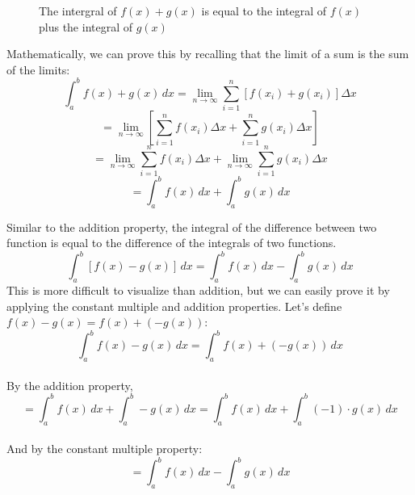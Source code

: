 \begin{figure}[htbp]
    \centering
    \caption{The intergral of $f(x) + g(x)$ is equal to the integral 
    of $f(x)$ plus the integral of $g(x)$}
    \label{fig:intsum}
\end{figure}

Mathematically, we can prove this by recalling that the limit of a 
sum is the sum of the limits: $$\int_a^b f(x) + g(x)\,dx = 
\lim_{n \to \infty} \sum_{i=1}^n [f(x_i)+g(x_i)]\Delta x$$ 
$$=\lim_{n \to \infty} [\sum_{i=1}^n f(x_i)\Delta x + \sum_{i = 1}^n 
g(x_i) \Delta x]$$ $$= \lim_{n \to \infty}\sum_{i=1}^n f(x_i)\Delta 
x + \lim_{n \to \infty} \sum_{i = 1}^n g(x_i) \Delta x$$ $$ = 
\int_a^b f(x)\,dx + \int_a^b g(x)\,dx$$

Similar to the addition property, the integral of the difference 
between two function is equal to the difference of the integrals of 
two functions. $$\int_a^b [f(x) - g(x)]\,dx = \int_a^b f(x)\,dx - 
\int_a^b g(x)\,dx$$ This is more difficult to visualize than addition, 
but we can easily prove it by applying the constant multiple and 
addition properties. Let's define $f(x) - g(x) = f(x) + (-g(x))$: 
$$\int_a^b f(x) - g(x)\,dx = \int_a^b f(x) + (-g(x))\,dx$$\\
By the addition property, $$=\int_a^b f(x)\,dx + \int_a^b -g(x)\,dx = 
\int_a^b f(x)\,dx + \int_a^b (-1)\cdot g(x)\,dx$$\\
And by the constant multiple property: $$=\int_a^b f(x)\,dx - \int_a^b 
g(x)\,dx$$

